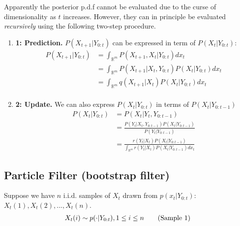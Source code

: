 \documentclass[11pt]{elegantbook}
\begin{document}
Apparently the posterior p.d.f cannot be evaluated due to the curse of dimensionality as $t$ increases. However, they can in principle be evaluated \textit{recursively} using the following two-step procedure.

\begin{enumerate}
    \item \textbf{ 1: Prediction.} $P(X_{t+1}|Y_{0:t})$ can be expressed in term of $P(X_t|Y_{0:t})$:
    \begin{equation}
        \begin{aligned}
            P(X_{t+1}|Y_{0:t})&=\int_{\mathbb{R}^m}P(X_{t+1},X_t|Y_{0:t})dx_t\\
            &=\int_{\mathbb{R}^m}P(X_{t+1}|X_t, Y_{0:t})P(X_t|Y_{0:t})dx_t\\
            &=\int_{\mathbb{R}^m}q(X_{t+1}|X_t)P(X_t|Y_{0:t})dx_t\\
        \end{aligned}
        \nonumber
    \end{equation}
    \item \textbf{ 2: Update.} We can also express $P(X_t|Y_{0:t})$ in terms of $P(X_t|Y_{0:t-1})$
    \begin{equation}
        \begin{aligned}
            P(X_{t}|Y_{0:t})&=P(X_t|Y_{t},Y_{0:t-1})\\
            &=\frac{P(Y_t|X_t,Y_{0:t-1})P(X_t|Y_{0:t-1})}{P(Y_t|Y_{0:t-1})}\\
            &=\frac{r(Y_t|X_t)P(X_t|Y_{0:t-1})}{\int_{\mathbb{R}^m}r(Y_t|X_t)P(X_t|Y_{0:t-1})dx_t}
        \end{aligned}
        \nonumber
    \end{equation}
\end{enumerate}

\subsection{Particle Filter (bootstrap filter)}
Suppose we have $n$ i.i.d. samples of $X_t$ drawn from $p(x_t|Y_{0:t})$: $X_t(1),X_t(2),...,X_t(n)$.
\begin{equation}
    \begin{aligned}
        X_{t}(i)\sim p(\cdot|Y_{0:t}),1\leq i\leq n
    \end{aligned}
    \tag{\text{Sample 1}}
\end{equation}
\end{document}
